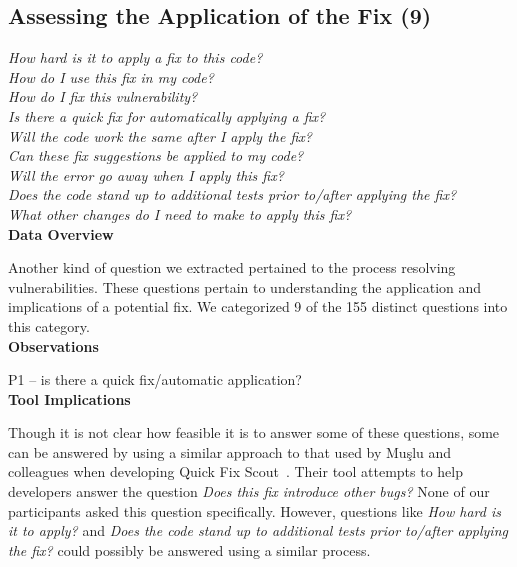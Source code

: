 \documentclass[conference]{IEEEtran}
\begin{document}

\noindent\subsection{\textbf{Assessing the Application of the Fix (9)}}\label{aaf}

\noindent\emph{How hard is it to apply a fix to this code?} \\
\emph{How do I use this fix in my code?} \\
\emph{How do I fix this vulnerability?} \\
\emph{Is there a quick fix for automatically applying a fix?} \\
\emph{Will the code work the same after I apply the fix?} \\
\emph{Can these fix suggestions be applied to my code?} \\
\emph{Will the error go away when I apply this fix?} \\
\emph{Does the code stand up to additional tests prior to/after applying the fix?} \\
\emph{What other changes do I need to make to apply this fix?} \\


\noindent\textbf{Data Overview}

Another kind of question we extracted pertained to the process resolving vulnerabilities. 
These questions pertain to understanding the application and implications of a potential fix. 
We categorized 9 of the 155 distinct questions into this category.
\\

\noindent\textbf{Observations}

P1 -- is there a quick fix/automatic application?
\\

\noindent\textbf{Tool Implications}

Though it is not clear how feasible it is to answer some of these questions, some can be answered by using a similar approach to that used by Mu{\c{s}}lu and colleagues when developing Quick Fix Scout~\cite{mucslu2012speculative}. 
Their tool attempts to help developers answer the question \textit{Does this fix introduce other bugs?} 
None of our participants asked this question specifically. 
However, questions like \textit{How hard is it to apply?} and \textit{Does the code stand up to additional tests prior to/after applying the fix?} could possibly be answered using a similar process.
\end{document}
